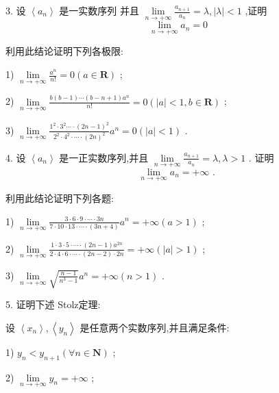 3. 设 $\left\langle  {a}_{n}\right\rangle$ 是一实数序列 并且 $\mathop{\lim }\limits_{{n \rightarrow   + \infty }}\frac{{a}_{n + 1}}{{a}_{n}} = \lambda ,\left| \lambda \right|  < 1$ ,证明
$$\mathop{\lim }\limits_{{n \rightarrow   + \infty }}{a}_{n} = 0$$

利用此结论证明下列各极限:

1) $\mathop{\lim }\limits_{{n \rightarrow   + \infty }}\frac{{a}^{n}}{n!} = 0\left( {a \in  \mathbf{R}}\right)$ ;

2) $\mathop{\lim }\limits_{{n \rightarrow   + \infty }}\frac{b\left( {b - 1}\right) \cdots \left( {b - n + 1}\right) {a}^{n}}{n!} = 0\left( {\left| a\right|  < 1,b \in  \mathbf{R}}\right)$ ;

3) $\mathop{\lim }\limits_{{n \rightarrow   + \infty }}\frac{{1}^{2} \cdot  {3}^{2}\cdots  \cdot  {\left( 2n - 1\right) }^{2}}{{2}^{2} \cdot  {4}^{2} \cdot  \cdots  \cdot  {\left( 2n\right) }^{2}}{a}^{n} = 0\left( {\left| a\right|  < 1}\right)$ .

4. 设 $\left\langle  {a}_{n}\right\rangle$ 是一正实数序列,并且 $\mathop{\lim }\limits_{{n \rightarrow   + \infty }}\frac{{a}_{n + 1}}{{a}_{n}} = \lambda ,\lambda  > 1$ . 证明
$$\mathop{\lim }\limits_{{n \rightarrow   + \infty }}{a}_{n} =  + \infty \text{ . }$$

利用此结论证明下列各题:

1) $\mathop{\lim }\limits_{{n \rightarrow   + \infty }}\frac{3 \cdot  6 \cdot  9 \cdot  \cdots  \cdot  {3n}}{7 \cdot  {10} \cdot  {13} \cdot  \cdots  \cdot  \left( {{3n} + 4}\right) }{a}^{n} =  + \infty \left( {a > 1}\right)$ ;

2) $\mathop{\lim }\limits_{{n \rightarrow   + \infty }}\frac{1 \cdot  3 \cdot  5 \cdot  \cdots  \cdot  \left( {{2n} - 1}\right) {a}^{2n}}{2 \cdot  4 \cdot  6 \cdot  \cdots  \cdot  \left( {{2n} - 2}\right)  \cdot  {2n}} =  + \infty \left( {\left| a\right|  > 1}\right)$ ;

3) $\mathop{\lim }\limits_{{n \rightarrow   + \infty }}\sqrt{\frac{n - 1}{{n}^{3} - 1}}{a}^{n} =  + \infty \left( {n > 1}\right)$ .

5. 证明下述 Stolz定理:

设 $\left\langle  {x}_{n}\right\rangle  ,\left\langle  {y}_{n}\right\rangle$ 是任意两个实数序列,并且满足条件:

1) ${y}_{n} < {y}_{n + 1}\left( {\forall n \in  \mathbf{N}}\right)$ ;

2) $\mathop{\lim }\limits_{{n \rightarrow   + \infty }}{y}_{n} =  + \infty$ ;

